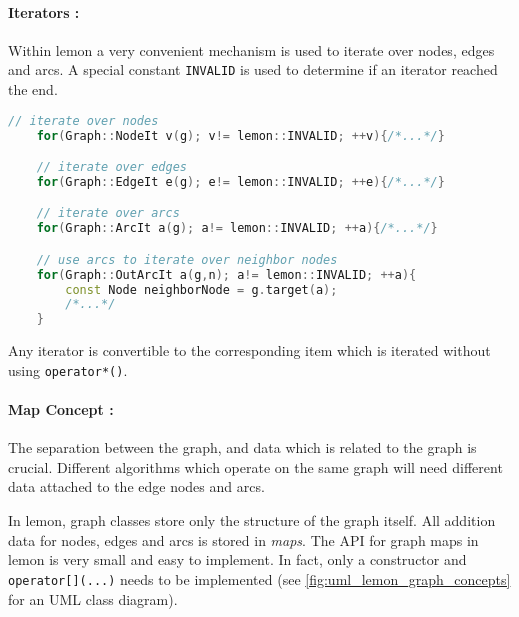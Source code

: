 \label{par:lemon_iterators}
\paragraph{Iterators :}
    Within lemon a very convenient mechanism is used to iterate over
    nodes, edges and arcs.
    A special constant \lstinline{INVALID} is used to determine if 
    an iterator reached the end.

    \begin{lstlisting}[language=c++]
    // iterate over nodes
    for(Graph::NodeIt v(g); v!= lemon::INVALID; ++v){/*...*/}

    // iterate over edges
    for(Graph::EdgeIt e(g); e!= lemon::INVALID; ++e){/*...*/}

    // iterate over arcs
    for(Graph::ArcIt a(g); a!= lemon::INVALID; ++a){/*...*/}

    // use arcs to iterate over neighbor nodes
    for(Graph::OutArcIt a(g,n); a!= lemon::INVALID; ++a){
        const Node neighborNode = g.target(a);
        /*...*/
    }
    \end{lstlisting}

    Any iterator is convertible to the corresponding item which
    is iterated without using \lstinline{operator*()}.

\paragraph{Map Concept :}
    The separation between the graph, and data which is related to
    the graph is crucial.
    Different algorithms which operate on the same graph will
    need different data attached to the edge nodes and arcs. 

    In lemon, graph classes store only the structure of the graph itself.
    All addition data for nodes, edges and arcs is stored 
    in \emph{maps}.
    The API for graph maps in lemon is very small and easy to implement.
    In fact, only a constructor and \lstinline{operator[](...)} needs
    to be implemented (see \cref{fig:uml_lemon_graph_concepts} for an UML class diagram).



